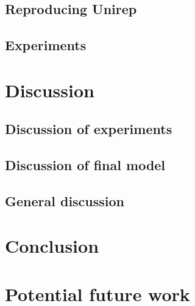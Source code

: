 \documentclass[a4paper]{article}
\begin{document}
\subsection{Reproducing Unirep}
\subsection{Experiments}

\section{Discussion}
\subsection{Discussion of experiments}
\subsection{Discussion of final model}
\subsection{General discussion}

\section{Conclusion}

\section{Potential future work}



{}

\end{document}
